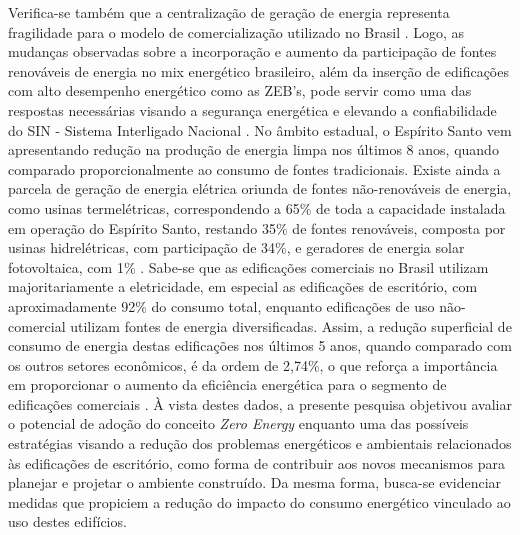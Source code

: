 \begin{onehalfspace}
     Verifica-se  também  que  a  centralização  de  geração  de  energia  representa  fragilidade  
     para  o modelo  de  comercialização  utilizado  no  Brasil \cite{Pinto2017}. 
     Logo,  as mudanças observadas sobre a incorporação e aumento da participação de fontes 
     renováveis de energia  no mix  energético  brasileiro,  além  da  inserção  de  edificações  
     com  alto  desempenho energético como as ZEB’s, pode servir como uma das respostas necessárias 
     visando a segurança energética  e  elevando  a  confiabilidade  do  SIN  -  Sistema  Interligado
     Nacional \cite{EmpresadePesquisaEnergetica-EPE2017a}.\vspace*{0.3cm} \newline No âmbito estadual, o Espírito Santo 
     vem apresentando redução na produção de energia limpa nos últimos 8 anos, quando comparado 
     proporcionalmente ao consumo de fontes tradicionais. Existe ainda a parcela de geração de 
     energia elétrica oriunda de fontes não-renováveis de energia, como usinas termelétricas, 
     correspondendo a 65\% de toda a capacidade instalada em operação do  Espírito  Santo,  
     restando  35\%  de  fontes  renováveis,  composta  por  usinas  hidrelétricas,  com 
     participação  de  34\%,  e  geradores  de  energia  solar  fotovoltaica,  com  1\% 
     \cite{AgenciadeRegulacaodeServicosPublicosdoEspiritoSanto-ARSP2019,EnergiasdePortugal-EDP2017}.\vspace*{0.3cm} \newline
     Sabe-se  que  as  edificações  comerciais no  Brasil  utilizam  majoritariamente  a  eletricidade,  
     em especial  as  edificações  de escritório,  com  aproximadamente  92\%  do  consumo  total,  enquanto edificações  de  
     uso  não-comercial  utilizam  fontes  de  energia  diversificadas.  Assim,  a  redução 
     superficial de consumo de energia destas edificações nos últimos 5 anos, quando comparado 
     com os  outros  setores  econômicos,  é  da  ordem  de  2,74\%,  o  que  reforça  a  
     importância  em proporcionar  o  aumento  da  eficiência  energética  para  o  segmento  
     de  edificações  comerciais \cite{AgenciadeRegulacaodeServicosPublicosdoEspiritoSanto-ARSP2018,
     AgenciadeRegulacaodeServicosPublicosdoEspiritoSanto-ARSP2019,
     EmpresadePesquisaEnergetica-EPE2018}.\vspace*{0.3cm} \newline
     À vista  destes dados,  a presente pesquisa objetivou avaliar  o  potencial de adoção  do  conceito \textit{Zero  
     Energy}   enquanto   uma  das  possíveis   estratégias  visando   a   redução   dos  
     problemas energéticos e ambientais relacionados às edificações de escritório, como forma 
     de contribuir aos novos mecanismos para planejar e projetar o ambiente construído. Da mesma 
     forma, busca-se evidenciar  medidas que propiciem  a  redução  do impacto  do  consumo  
     energético  vinculado  ao uso destes edifícios.
\end{onehalfspace}
